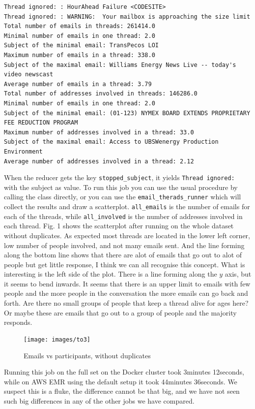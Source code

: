 \documentclass[runningheads,a4paper]{llncs}
\begin{document}
\begin{verbatim}
Thread ignored: : HourAhead Failure <CODESITE>
Thread ignored: : WARNING:  Your mailbox is approaching the size limit
Total number of emails in threads: 261414.0
Minimal number of emails in one thread: 2.0
Subject of the minimal email: TransPecos LOI
Maximum number of emails in a thread: 338.0
Subject of the maximal email: Williams Energy News Live -- today's video newscast
Average number of emails in a thread: 3.79
Total number of addresses involved in threads: 146286.0
Minimal number of emails in one thread: 2.0
Subject of the minimal email: (01-123) NYMEX BOARD EXTENDS PROPRIETARY FEE REDUCTION PROGRAM
Maximum number of addresses involved in a thread: 33.0
Subject of the maximal email: Access to UBSWenergy Production Environment
Average number of addresses involved in a thread: 2.12
\end{verbatim}
When the reducer gets the key \verb!stopped_subject!, it yields \verb!Thread ignored: ! with the subject as value.
\newline
To run this job you can use the usual procedure by calling the class directly, or you can use the \verb!email_therads_runner! which will collect the results and draw a scatterplot.
\verb!all_emails! is the number of emails for each of the threads, while \verb!all_involved! is the number of addresses involved in each thread.
\newline
Fig. 1 shows the scatterplot after running on the whole dataset without duplicates. As expected most threads are located in the lower left corner, low number of people involved, and not many emails sent. And the line forming along the bottom line shows that there are alot of emails that go out to alot of people but get little response, I think we can all recognise this concept. What is interesting is the left side of the plot. There is a line forming along the $y$ axis, but it seems to bend inwards. It seems that there is an upper limit to emails with few people and the more people in the conversation the more emails can go back and forth. Are there no small groups of people that keep a thread alive for ages here? Or maybe these are emails that go out to a group of people and the majority responds.
\begin{figure}[h]
	\begin{center}
		\texttt{[image: images/to3]}
	\end{center}
	\caption{Emails vs participants, without duplicates}
\end{figure}
Running this job on the full set on the Docker cluster took 3minutes 12seconds, while on AWS EMR using the default setup it took 44minutes 36seconds. We suspect this is a fluke, the difference cannot be that big, and we have not seen such big differences in any of the other jobs we have compared.
\end{document}
